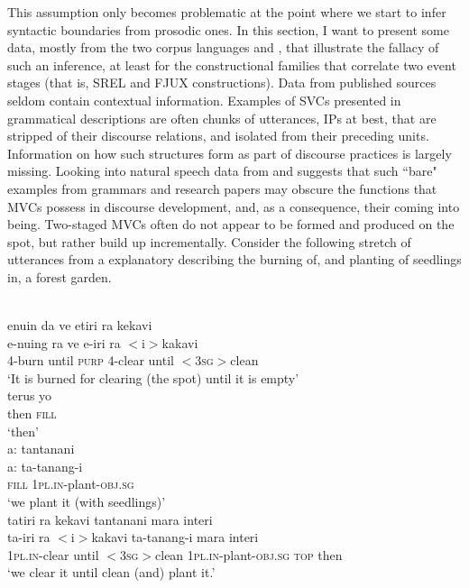 This assumption only becomes problematic at the point where we start to infer syntactic boundaries from prosodic ones. In this section, I want to present some data, mostly from the two corpus languages  and , that illustrate the fallacy of such an inference, at least for the constructional families that correlate two event stages (that is, SREL and FJUX constructions). Data from published sources seldom contain contextual information. Examples of SVCs presented in grammatical descriptions are often chunks of utterances, IPs at best, that are stripped of their discourse relations, and isolated from their preceding units. Information on how such structures form as part of discourse practices is largely missing. Looking into natural speech data from  and  suggests that such ``bare" examples from grammars and research papers may obscure the functions that MVCs possess in discourse development, and, as a consequence, their coming into being. Two-staged MVCs often do not appear to be formed and produced on the spot, but rather build up incrementally. Consider the following stretch of utterances from a  explanatory describing the burning of, and planting of seedlings in, a forest garden.

\ea \label{Wooi_gardening1}
\\
\ea
\glll enuin da ve etiri ra kekavi \\
e-nuing ra ve e-iri ra $<$i$>$kakavi \\
\textsc{4}-burn until \textsc{purp} \textsc{4}-clear until $<$\textsc{3}\textsc{sg}$>$clean \\
\glft `It is burned for clearing (the spot) until it is empty' \\
\ex
\gll terus yo \\
then \textsc{fill} \\
\glft `then' \\
\ex
\glll a: tantanani \\
a: ta-tanang-i \\
\textsc{fill} \textsc{1}\textsc{pl}.\textsc{in}-plant-\textsc{obj}.\textsc{sg} \\
\glft `we plant it (with seedlings)' \\
\ex
\glll tatiri ra kekavi tantanani mara interi \\
ta-iri ra $<$i$>$kakavi ta-tanang-i mara interi \\
\textsc{1}\textsc{pl}.\textsc{in}-clear until $<$\textsc{3}\textsc{sg}$>$clean \textsc{1}\textsc{pl}.\textsc{in}-plant-\textsc{obj}.\textsc{sg} \textsc{top} then \\
\glft `we clear it until clean (and) plant it.'\\
\z
\z

